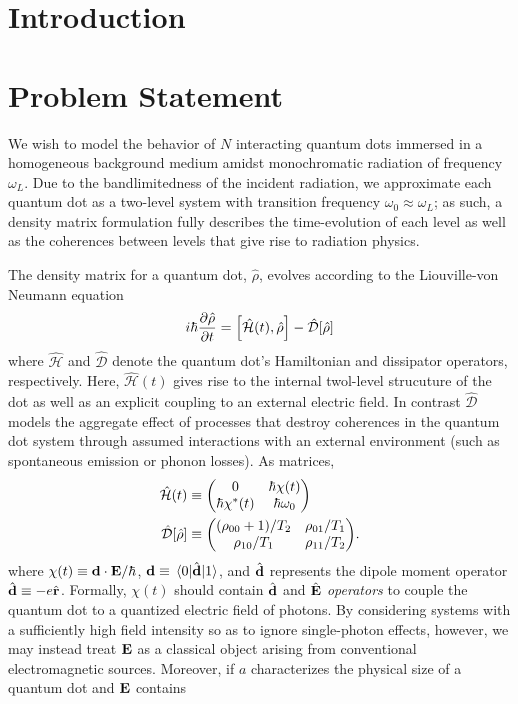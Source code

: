 \documentclass[conference]{IEEEtran}
\begin{document}
\IEEEpeerreviewmaketitle

\section{Introduction}


\section{Problem Statement}
We wish to model the behavior of $N$ interacting quantum dots immersed in a homogeneous background medium amidst monochromatic radiation of frequency $\omega_L$.
Due to the bandlimitedness of the incident radiation, we approximate each quantum dot as a two-level system with transition frequency $\omega_0 \approx \omega_L$; as such, a density matrix formulation fully describes the time-evolution of each level as well as the coherences between levels that give rise to radiation physics.

The density matrix for a quantum dot, $\hat{\rho}$, evolves according to the Liouville-von Neumann equation
\begin{equation}
  i \hbar \pdv{\hat{\rho}}{t} = \commutator{\hat{\mathcal{H}}(t)}{\hat{\rho}} - \hat{\mathcal{D}}\qty[\hat{\rho}]
  \label{eq:liouville}
\end{equation}
where $\hat{\mathcal{H}}$ and $\hat{\mathcal{D}}$ denote the quantum dot's Hamiltonian and dissipator operators, respectively.
Here, $\hat{\mathcal{H}}(t)$ gives rise to the internal twol-level strucuture of the dot as well as an explicit coupling to an external electric field.
In contrast $\hat{\mathcal{D}}$ models the aggregate effect of processes that destroy coherences in the quantum dot system through assumed interactions with an external environment (such as spontaneous emission or phonon losses).
As matrices,
\begin{subequations}
  \begin{align}
    \hat{\mathcal{H}}(t) &\equiv \mqty(0 & \hbar \chi(t) \\ \hbar \chi^*(t) & \hbar \omega_0) \label{eq:hamiltonian} \\
    \hat{\mathcal{D}}[\hat{\rho}] &\equiv \mqty((\rho_{00} + 1)/T_2 & \rho_{01}/T_1 \\ \rho_{10}/T_1 & \rho_{11}/T_2). \label{eq:dissipator}
  \end{align}
\end{subequations}
where $\chi(t) \equiv \vb{d} \cdot \vb{E}/\hbar$, $\vb{d} \equiv \matrixel{0}{\hat{\vb{d}}}{1}$, and $\hat{\vb{d}}$ represents the dipole moment operator $\hat{\vb{d}} \equiv -e \hat{\vb{r}}$. 
Formally, $\chi(t)$ should contain $\hat{\vb{d}}$ and $\hat{\vb{E}}$ \emph{operators} to couple the quantum dot to a quantized electric field of photons.
By considering systems with a sufficiently high field intensity so as to ignore single-photon effects, however, we may instead treat $\vb{E}$ as a classical object arising from conventional electromagnetic sources.
Moreover, if $a$ characterizes the physical size of a quantum dot and $\vb{E}$ contains 
\end{document}
